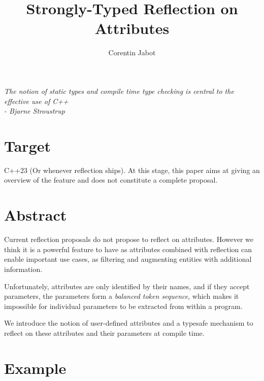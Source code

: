 \documentclass{wg21}
\title{Strongly-Typed Reflection on Attributes}
\author{Corentin Jabot}{corentin.jabot@gmail.com}
\begin{document}
\maketitle



\begin{flushright}
    \hfill \break
    \hfill \break
    \textit{The notion of static types and compile time type checking is central to the effective use of C++\\
    - Bjarne Stroustrup}
\end{flushright}


\section{Target}

C++23 (Or whenever reflection ships).
At this stage, this paper aims at giving an overview of the feature and does not constitute a complete proposal.

\section{Abstract}

Current reflection proposals do not propose to reflect on attributes. 
However we think it is a powerful feature to have as attributes combined with reflection can enable important use cases, as filtering and augmenting entities with additional information.

Unfortunately, attributes are only identified by their names, and if they accept parameters, the parameters form
a \emph{balanced token sequence}, which makes it impossible for individual parameters to be extracted from within a program.

We introduce the notion of user-defined attributes and a typesafe mechanism to reflect on these attributes and their parameters
at compile time.



\pagebreak

\section{Example}
\end{document}
